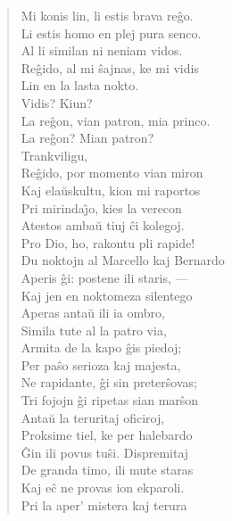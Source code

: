 \begin{verse}
 Mi konis lin, li estis brava reĝo.\\
 Li estis homo en plej pura senco.\\
                Al li similan ni neniam vidos.\\
 Re\^gido, al mi \^sajnas, ke mi vidis\\
                Lin en la lasta nokto.\\
 Vidis? Kiun?\\
 La reĝon, vian patron, mia princo.\\
 La reĝon? Mian patron?\\
 Trankviligu,\\
                Re\^gido, por momento vian miron\\
                Kaj ela\u uskultu, kion mi raportos\\
                Pri mirinda\^{\j}o, kies la verecon\\
                Atestos amba\u u tiuj \^ci kolegoj.\\
 Pro Dio, ho, rakontu pli rapide!\\
 Du noktojn al Marcello kaj Bernardo\\
                Aperis \^gi: postene ili staris, ---\\
                Kaj jen en noktomeza silentego\\
                Aperas anta\u u ili ia ombro,\\
                Simila tute al la patro via,\\
                Armita de la kapo \^gis piedoj;\\
                Per pa\^so serioza kaj majesta,\\
                Ne rapidante, \^gi sin preter\^sovas;\\
                Tri fojojn \^gi ripetas sian mar\^son\\
                Anta\u u la teruritaj oficiroj,\\
                Proksime tiel, ke per halebardo\\
                \^Gin ili povus tu\^si. Dispremitaj\\
                De granda timo, ili mute staras\\
                Kaj e\^c ne provas ion ekparoli.\\
                Pri la aper' mistera kaj terura\\

\end{verse}
